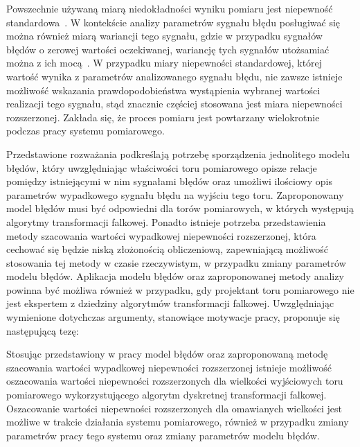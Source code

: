 Powszechnie używaną miarą niedokładności wyniku pomiaru jest niepewność standardowa~\cite{jcgm_guide}. W kontekście analizy parametrów sygnału błędu posługiwać się można również miarą wariancji tego sygnału, gdzie w przypadku sygnałów błędów o zerowej wartości oczekiwanej, wariancję tych sygnałów utożsamiać można z ich mocą~\cite{oppenheim_sns}. W przypadku miary niepewności standardowej, której wartość wynika z parametrów analizowanego sygnału błędu, nie zawsze istnieje możliwość wskazania prawdopodobieństwa wystąpienia wybranej wartości realizacji tego sygnału, stąd znacznie częściej stosowana jest miara niepewności rozszerzonej. Zakłada się, że proces pomiaru jest powtarzany wielokrotnie podczas pracy systemu pomiarowego.

Przedstawione rozważania podkreślają potrzebę sporządzenia jednolitego modelu błędów, który uwzględniając właściwości toru pomiarowego opisze relacje pomiędzy istniejącymi w nim sygnałami błędów oraz umożliwi ilościowy opis parametrów wypadkowego sygnału błędu na wyjściu tego toru. Zaproponowany model błędów musi być odpowiedni dla torów pomiarowych, w których występują algorytmy transformacji falkowej. Ponadto istnieje potrzeba przedstawienia metody szacowania wartości wypadkowej niepewności rozszerzonej, która cechować się będzie niską złożonością obliczeniową, zapewniającą możliwość stosowania tej metody w czasie rzeczywistym, w przypadku zmiany parametrów modelu błędów. Aplikacja modelu błędów oraz zaproponowanej metody analizy powinna być możliwa również w przypadku, gdy projektant toru pomiarowego nie jest ekspertem z dziedziny algorytmów transformacji falkowej. Uwzględniając wymienione dotychczas argumenty, stanowiące motywacje pracy, proponuje się następującą tezę:

\begin{quoting}[font = bfseries]
Stosując przedstawiony w pracy model błędów oraz zaproponowaną metodę szacowania wartości wypadkowej niepewności rozszerzonej istnieje możliwość oszacowania wartości niepewności rozszerzonych dla wielkości wyjściowych toru pomiarowego wykorzystującego algorytm dyskretnej transformacji falkowej. Oszacowanie wartości niepewności rozszerzonych dla omawianych wielkości jest możliwe w trakcie działania systemu pomiarowego, również w przypadku zmiany parametrów pracy tego systemu oraz zmiany parametrów modelu błędów.
\end{quoting}

